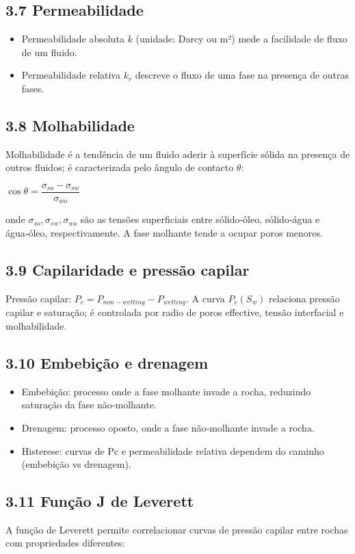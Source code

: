 \documentclass[11pt,a4paper]{article}
\begin{document}
\subsection{3.7 Permeabilidade}
\begin{itemize}
\item Permeabilidade absoluta $k$ (unidade: Darcy ou m²) mede a facilidade de fluxo de um fluido.
\item Permeabilidade relativa $k_{r}$ descreve o fluxo de uma fase na presença de outras fases.
\end{itemize}

\subsection{3.8 Molhabilidade}
Molhabilidade é a tendência de um fluido aderir à superfície sólida na presença de outros fluidos; é caracterizada pelo ângulo de contacto $\theta$:

$\cos\theta = \dfrac{\sigma_{so}-\sigma_{sw}}{\sigma_{wo}}$

onde $\sigma_{so},\sigma_{sw},\sigma_{wo}$ são as tensões superficiais entre sólido‑óleo, sólido‑água e água‑óleo, respectivamente. A fase molhante tende a ocupar poros menores.

\subsection{3.9 Capilaridade e pressão capilar}
Pressão capilar: $P_c = P_{non-wetting} - P_{wetting}$. A curva $P_c(S_w)$ relaciona pressão capilar e saturação; é controlada por radio de poros effective, tensão interfacial e molhabilidade.

\subsection{3.10 Embebição e drenagem}
\begin{itemize}
\item Embebição: processo onde a fase molhante invade a rocha, reduzindo saturação da fase não‑molhante.
\item Drenagem: processo oposto, onde a fase não‑molhante invade a rocha.
\item Histerese: curvas de Pc e permeabilidade relativa dependem do caminho (embebição vs drenagem).
\end{itemize}

\subsection{3.11 Função J de Leverett}
A função de Leverett permite correlacionar curvas de pressão capilar entre rochas com propriedades diferentes:
\end{document}
